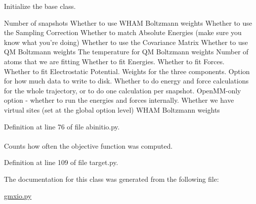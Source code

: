 \-Initialize the base class. 

\-Number of snapshots \-Whether to use \-W\-H\-A\-M \-Boltzmann weights \-Whether to use the \-Sampling \-Correction \-Whether to match \-Absolute \-Energies (make sure you know what you're doing) \-Whether to use the \-Covariance \-Matrix \-Whether to use \-Q\-M \-Boltzmann weights \-The temperature for \-Q\-M \-Boltzmann weights \-Number of atoms that we are fitting \-Whether to fit \-Energies. \-Whether to fit \-Forces. \-Whether to fit \-Electrostatic \-Potential. \-Weights for the three components. \-Option for how much data to write to disk. \-Whether to do energy and force calculations for the whole trajectory, or to do one calculation per snapshot. \-Open\-M\-M-\/only option -\/ whether to run the energies and forces internally. \-Whether we have virtual sites (set at the global option level) \-W\-H\-A\-M \-Boltzmann weights 

\-Definition at line 76 of file abinitio.\-py.

\hypertarget{classforcebalance_1_1target_1_1Target_ad4cd0ab38d8fc97d3e7a6e22ce130a16}{
\paragraph[{xct}]{}}\label{classforcebalance_1_1target_1_1Target_ad4cd0ab38d8fc97d3e7a6e22ce130a16}


\-Counts how often the objective function was computed. 



\-Definition at line 109 of file target.\-py.



\-The documentation for this class was generated from the following file\-:\begin{DoxyCompactItemize}
\item 
\hyperlink{gmxio_8py}{gmxio.\-py}\end{DoxyCompactItemize}
